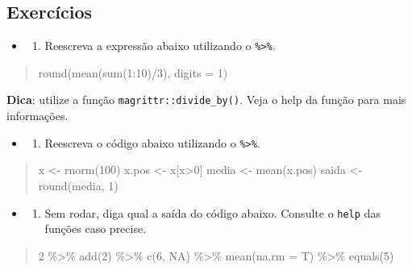 \documentclass[]{book}
\providecommand{\tightlist}{%
  \setlength{\itemsep}{0pt}\setlength{\parskip}{0pt}}
\begin{document}
\hypertarget{exercuxedcios-4}{%
\subsection{Exercícios}\label{exercuxedcios-4}}

\begin{itemize}
\item
  \begin{enumerate}
  \def\labelenumi{\arabic{enumi}.}
  \tightlist
  \item
    Reescreva a expressão abaixo utilizando o \texttt{\%\textgreater{}\%}.
  \end{enumerate}
\end{itemize}

\begin{quote}
round(mean(sum(1:10)/3), digits = 1)
\end{quote}

\textbf{Dica}: utilize a função \texttt{magrittr::divide\_by()}. Veja o help da função para mais informações.

\begin{itemize}
\item
  \begin{enumerate}
  \def\labelenumi{\arabic{enumi}.}
  \setcounter{enumi}{1}
  \tightlist
  \item
    Reescreva o código abaixo utilizando o \texttt{\%\textgreater{}\%}.
  \end{enumerate}
\end{itemize}

\begin{quote}
x \textless- rnorm(100)
x.pos \textless- x{[}x\textgreater0{]}
media \textless- mean(x.pos)
saida \textless- round(media, 1)
\end{quote}

\begin{itemize}
\item
  \begin{enumerate}
  \def\labelenumi{\arabic{enumi}.}
  \setcounter{enumi}{2}
  \tightlist
  \item
    Sem rodar, diga qual a saída do código abaixo. Consulte o \texttt{help} das funções caso precise.
  \end{enumerate}
\end{itemize}

\begin{quote}
2 \%\textgreater\%
add(2) \%\textgreater\%
c(6, NA) \%\textgreater\%
mean(na.rm = T) \%\textgreater\%
equals(5)
\end{quote}
\end{document}
